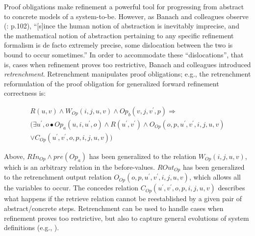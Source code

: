 \documentclass[10pt, conference, compsocconf]{IEEEtran}
\begin{document}
Proof obligations make refinement a powerful tool for progressing from abstract to concrete models of a system-to-be. However, as Banach and colleagues observe (\cite{Banach+:2007:FI}: p.102), ``[s]ince the human notion of abstraction is inevitably imprecise, and the mathematical notion of abstraction pertaining to any specific refinement formalism is de facto extremely precise, some dislocation between the two is bound to occur sometimes.'' In order to accommodate these ``dislocations'', that is, cases when refinement proves too restrictive, Banach and colleagues introduced \cite{Banach+:1998:B} \textit{retrenchment}. Retrenchment manipulates proof obligations; e.g., the retrenchment reformulation of the proof obligation for generalized forward refinement correctness is:

\begin{small}
\begin{multline*}
R(u,v) \wedge W_{Op}(i,j,u,v) \wedge Op_{b}(v,j,v^{\prime},p) \Rightarrow \\
(\exists u^{\prime},o \bullet Op_{a}(u,i,u^{\prime},o) \wedge R(u^{\prime},v^{\prime}) \wedge O_{Op}(o, p, u^{\prime}, v^{\prime}, i, j, u, v) \\
\vee C_{Op}(u^{\prime}, v^{\prime}, o, p, i, j, u, v))
\end{multline*}
\end{small}

\noindent Above, $RIn_{Op} \wedge pre(Op_{a})$ has been generalized to the relation $W_{Op}(i,j,u,v)$, which is an arbitrary relation in the before-values. $ROut_{Op}$ has been generalized to the retrenchment output relation $O_{Op}(o, p, u^{\prime}, v^{\prime}, i, j, u, v)$, which allows all the variables to occur. The concedes relation $C_{Op}(u^{\prime}, v^{\prime}, o, p, i, j, u, v)$ describes what happens if the retrieve relation cannot be reestablished by a given pair of abstract/concrete steps. Retrenchment can be used to handle cases when refinement proves too restrictive, but also to capture general evolutions of system definitions (e.g., \cite{Banach+:1998:B,Banach+:2007:FI}).
\end{document}
